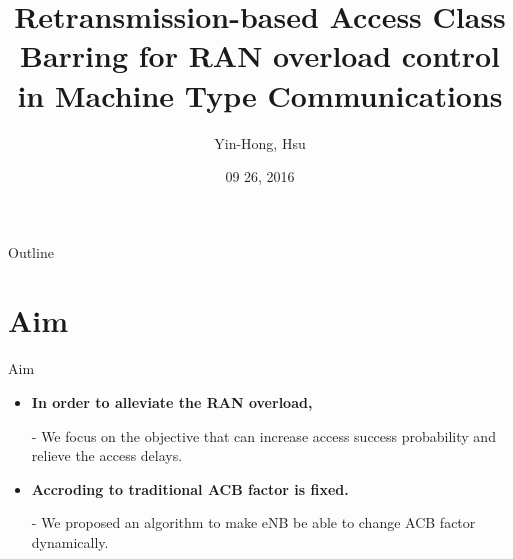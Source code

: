 \documentclass{beamer}
\title {
    Retransmission-based Access Class Barring for RAN overload control in Machine Type Communications
}
\author {
    Yin-Hong, Hsu
}
\date {
    09 26, 2016
}
\begin{document}
\begin{frame}
    \titlepage
\end{frame}


\begin{frame}{Outline}
    \tableofcontentsgather
    \tableofcontents
\end{frame}

\section{Aim}

\begin{frame} {Aim} 
    \begin{itemize}
        \item \textbf{In order to alleviate the RAN overload,}
        \item [-]{We focus on the objective that can increase access success probability and relieve the access delays.}
        \item \textbf{Accroding to traditional ACB factor is fixed.}
        \item [-]{We proposed an algorithm to make eNB be able to change ACB factor dynamically.} 
    \end{itemize}
\end{frame}

\end{document}
